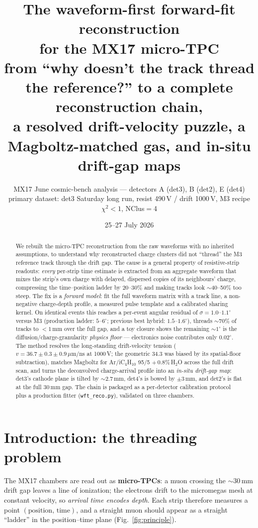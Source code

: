 \documentclass[11pt,a4paper]{article}
\title{\textbf{The waveform-first forward-fit reconstruction\\ for the MX17 micro-TPC}\\
\large from ``why doesn't the track thread the reference?'' to a complete
reconstruction chain,\\ a resolved drift-velocity puzzle, a Magboltz-matched gas,
and in-situ drift-gap maps}
\author{MX17 June cosmic-bench analysis --- detectors A (det3), B (det2), E (det4)\\
\small primary dataset: det3 Saturday long run, resist 490\,V / drift 1000\,V,
M3 recipe $\chi^2<1$, NClus$=$4}
\date{25--27 July 2026}
\newcommand{\um}{\,\mu\mathrm{m/ns}}
\begin{document}
\maketitle

\begin{abstract}
\noindent
We rebuilt the micro-TPC reconstruction from the raw waveforms with no inherited
assumptions, to understand why reconstructed charge clusters did not ``thread''
the M3 reference track through the drift gap. The cause is a general property of
resistive-strip readouts: \emph{every} per-strip time estimate is extracted from
an aggregate waveform that mixes the strip's own charge with delayed, dispersed
copies of its neighbours' charge, compressing the time--position ladder by
20--30\% and making tracks look $\sim$40--50\% too steep. The fix is a
\emph{forward model}: fit the full waveform matrix with a track line, a
non-negative charge-depth profile, a measured pulse template and a calibrated
sharing kernel. On identical events this reaches a per-event angular residual of
$\sigma=1.0$--$1.1^\circ$ versus M3 (production ladder: $5$--$6^\circ$; previous
best hybrid: $1.5$--$1.6^\circ$), threads $\sim$70\% of tracks to $<1$\,mm over
the full gap, and a toy closure shows the remaining $\sim$$1^\circ$ is the
diffusion/charge-granularity \emph{physics floor} --- electronics noise
contributes only $0.02^\circ$. The method resolves the long-standing
drift-velocity tension ($v = 36.7\pm0.3\pm0.9\um$ at 1000\,V; the geometric
34.3 was biased by its spatial-floor subtraction), matches Magboltz for
Ar/iC$_4$H$_{10}$ 95/5 $+\,0.8\%$\,H$_2$O across the full drift scan, and turns
the deconvolved charge-arrival profile into an \emph{in-situ drift-gap map}:
det3's cathode plane is tilted by $\sim$2.7\,mm, det4's is bowed by
$\pm$3\,mm, and det2's is flat at the full 30\,mm gap. The chain is packaged
as a per-detector calibration protocol plus a production fitter
(\texttt{wft\_reco.py}), validated on three chambers.
\end{abstract}

\tableofcontents

\section{Introduction: the threading problem}

The MX17 chambers are read out as \textbf{micro-TPCs}: a muon crossing the
$\sim$30\,mm drift gap leaves a line of ionization; the electrons drift to the
micromegas mesh at constant velocity, so \emph{arrival time encodes depth}.
Each strip therefore measures a point $(\text{position},\,\text{time})$, and a
straight muon should appear as a straight ``ladder'' in the position--time
plane (Fig.~\ref{fig:principle}).
\end{document}
